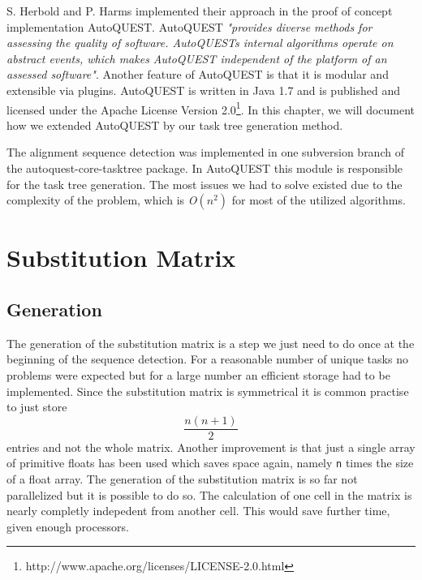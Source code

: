 
S. Herbold and P. Harms implemented their approach in the proof of concept implementation AutoQUEST.
AutoQUEST \textit{"provides diverse methods for assessing the quality
of software. AutoQUESTs internal algorithms operate on
abstract events, which makes AutoQUEST independent of
the platform of an assessed software"}\cite{herbold2013}.
Another feature of AutoQUEST is that it is modular and extensible via plugins.
AutoQUEST is written in Java 1.7 and is published and licensed under the Apache License Version 2.0\footnote{http://www.apache.org/licenses/LICENSE-2.0.html}.
In this chapter, we will document how we extended AutoQUEST by our task tree generation method.

The alignment sequence detection was implemented in one subversion branch of the autoquest-core-tasktree package.
In AutoQUEST this module is responsible for the task tree generation.
The most issues we had to solve existed due to the complexity of the problem, which is \textit{O}$(n^2)$ for most of the utilized algorithms.

\section{Substitution Matrix}
\subsection{Generation}
The generation of the substitution matrix is a step we just need to do once at the beginning of the sequence detection.
For a reasonable number of unique tasks no problems were expected but for a large number an efficient storage had to be implemented.
Since the substitution matrix is symmetrical it is common practise to just store \begin{equation*} \frac{n(n+1)}{2}\end{equation*} entries and not the whole matrix.
Another improvement is that just a single array of primitive floats has been used which saves space again, namely \texttt{n} times the size of a float array.
The generation of the substitution matrix is so far not parallelized but it is possible to do so.
The calculation of one cell in the matrix is nearly completly indepedent from another cell.
This would save further time, given enough processors.


